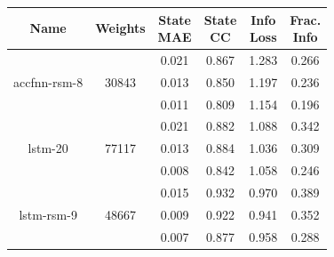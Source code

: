 \begin{table}[H]
    \centering
    \begin{tabular}{c|c|c|c|c|c}
Name &  Weights & \thead{State\\MAE} & \thead{State\\CC} & \thead{Info\\Loss} &\thead{Frac.\\Info}\\
\hline
\multirow{3}{6em}{accfnn-rsm-8} &  \multirow{3}{4em}{30843} & 0.021 & 0.867 & 1.283 & 0.266 \\ & & 0.013 & 0.850 & 1.197 & 0.236 \\ & & 0.011 & 0.809 & 1.154 & 0.196 \\
\hline
\multirow{3}{6em}{lstm-20} &  \multirow{3}{4em}{77117} & 0.021 & 0.882 & 1.088 & 0.342 \\ & & 0.013 & 0.884 & 1.036 & 0.309 \\ & & 0.008 & 0.842 & 1.058 & 0.246 \\
\hline
\multirow{3}{6em}{lstm-rsm-9} & \multirow{3}{4em}{48667} & 0.015 & 0.932 & 0.970 & 0.389 \\ & & 0.009 & 0.922 & 0.941 & 0.352 \\ & & 0.007 & 0.877 & 0.958 & 0.288 \\
    \end{tabular}
\end{table}

